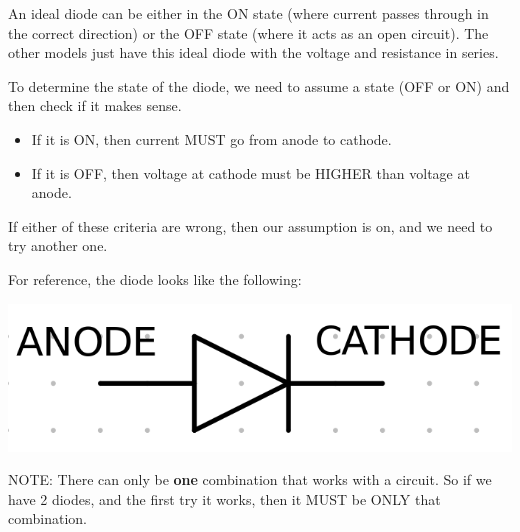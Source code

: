 \documentclass[12pt,letterpaper]{article} \usepackage{amsmath} \usepackage{graphicx} \usepackage[margin=1in]{geometry} \usepackage{longtable}  \usepackage{amssymb}
\begin{document}
	An ideal diode can be either in the ON state (where current passes through in the correct direction) or the OFF state (where it acts as an open circuit). The other models just have this ideal diode with the voltage and resistance in series. 
	
	To determine the state of the diode, we need to assume a state (OFF or ON) and then check if it makes sense.
	\begin{itemize}[]
		\item If it is ON, then current MUST go from anode to cathode.
		\item If it is OFF, then voltage at cathode must be HIGHER than voltage at anode. 
	\end{itemize}

	If either of these criteria are wrong, then our assumption is on, and we need to try another one. 
	
	For reference, the diode looks like the following:
	\begin{center}
		\includegraphics[width=0.3\linewidth]{diode-anode-cathode}
	\end{center}
	
	
	NOTE: There can only be \textbf{one } combination that works with a circuit. So if we have 2 diodes, and the first try it works, then it MUST be ONLY that combination.
	
\end{document}
